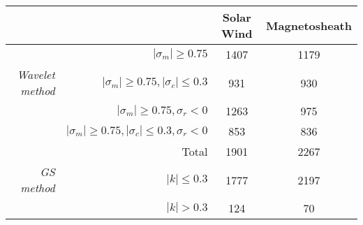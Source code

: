 \begin{tabular}{rrcc}
\hline
& & Solar Wind & Magnetosheath \\
\hline
                        & $|\sigma_m|\geq0.75$                                & 1407 & 1179 \\
\textit{Wavelet method} & $|\sigma_m|\geq0.75, |\sigma_c|\leq0.3$             & 931  & 930 \\
                        & $|\sigma_m|\geq0.75, \sigma_r<0$                    & 1263 & 975 \\
                        & $|\sigma_m|\geq0.75, |\sigma_c|\leq0.3, \sigma_r<0$ & 853  & 836 \\
\hline
                   & Total 		& 1901 & 2267 \\
\textit{GS method} & $|k|\leq 0.3$ & 1777 & 2197 \\
                   & $|k|> 0.3$    & 124  & 70 \\
\hline
\end{tabular}